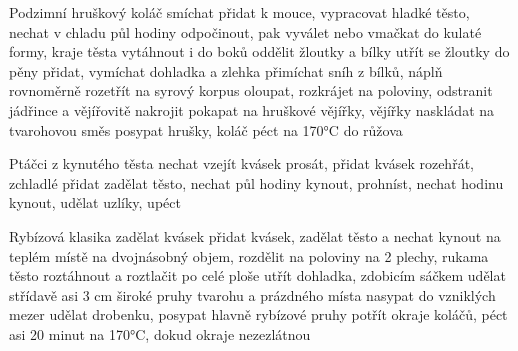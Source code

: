 \documentclass[12pt,a4paper]{article}
\begin{document}
\begin{recipe}{Podzimní hruškový koláč}
   smíchat
   přidat k mouce, vypracovat hladké těsto, nechat v chladu půl hodiny odpočinout, pak vyválet nebo vmačkat do kulaté formy, kraje těsta vytáhnout i do boků
   oddělit žloutky a bílky
   utřít se žloutky do pěny
   přidat, vymíchat dohladka a zlehka přimíchat sníh z bílků, náplň rovnoměrně rozetřít na syrový korpus
   oloupat, rozkrájet na poloviny, odstranit jádřince a vějířovitě nakrojit
   pokapat na hruškové vějířky, vějířky naskládat na tvarohovou směs
   posypat hrušky, koláč péct na 170°C do růžova
\end{recipe}
\newpage

\begin{recipe}{Ptáčci z kynutého těsta}
   nechat vzejít kvásek
   prosát, přidat kvásek
   rozehřát, zchladlé přidat
   zadělat těsto, nechat půl hodiny kynout, prohníst, nechat hodinu kynout, udělat uzlíky, upéct
\end{recipe}
\newpage

\begin{recipe}{Rybízová klasika}
   zadělat kvásek
   přidat kvásek, zadělat těsto a nechat kynout na teplém místě na dvojnásobný objem, rozdělit na poloviny na 2 plechy, rukama těsto roztáhnout a roztlačit po celé ploše
   utřít dohladka, zdobicím sáčkem udělat střídavě asi 3 cm široké pruhy tvarohu a prázdného místa
   nasypat do vzniklých mezer
   udělat drobenku, posypat hlavně rybízové pruhy
   potřít okraje koláčů, péct asi 20 minut na 170°C, dokud okraje nezezlátnou
\end{recipe}
\newpage
\end{document}

